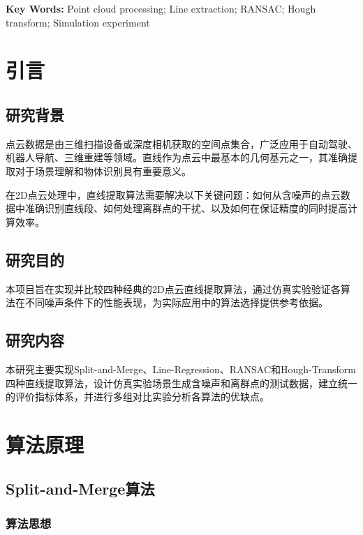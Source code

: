 \documentclass[12pt,a4paper]{article}
\begin{document}
\vspace{12pt}
{\fontsize{12pt}{20pt}\selectfont \textbf{Key Words:} Point cloud processing; Line extraction; RANSAC; Hough transform; Simulation experiment}

\newpage

\tableofcontents

\newpage

\section{引言}

\subsection{研究背景}

点云数据是由三维扫描设备或深度相机获取的空间点集合，广泛应用于自动驾驶、机器人导航、三维重建等领域。直线作为点云中最基本的几何基元之一，其准确提取对于场景理解和物体识别具有重要意义。

在2D点云处理中，直线提取算法需要解决以下关键问题：如何从含噪声的点云数据中准确识别直线段、如何处理离群点的干扰、以及如何在保证精度的同时提高计算效率。

\subsection{研究目的}

本项目旨在实现并比较四种经典的2D点云直线提取算法，通过仿真实验验证各算法在不同噪声条件下的性能表现，为实际应用中的算法选择提供参考依据。

\subsection{研究内容}

本研究主要实现Split-and-Merge、Line-Regression、RANSAC和Hough-Transform四种直线提取算法，设计仿真实验场景生成含噪声和离群点的测试数据，建立统一的评价指标体系，并进行多组对比实验分析各算法的优缺点。

\section{算法原理}

\subsection{Split-and-Merge算法}

\subsubsection{算法思想}
\end{document}
